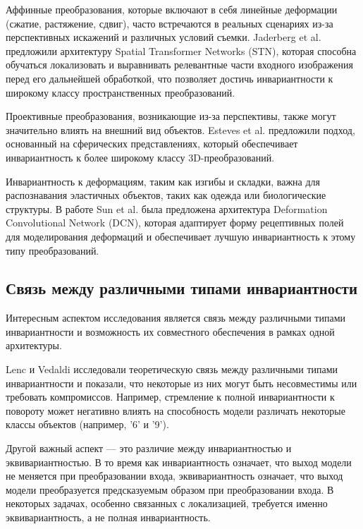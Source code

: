 Аффинные преобразования, которые включают в себя линейные деформации (сжатие, растяжение, сдвиг), часто встречаются в реальных сценариях из-за перспективных искажений и различных условий съемки. Jaderberg et al. \cite{Jaderberg2015} предложили архитектуру Spatial Transformer Networks (STN), которая способна обучаться локализовать и выравнивать релевантные части входного изображения перед его дальнейшей обработкой, что позволяет достичь инвариантности к широкому классу пространственных преобразований.

Проективные преобразования, возникающие из-за перспективы, также могут значительно влиять на внешний вид объектов. Esteves et al. \cite{Esteves2018} предложили подход, основанный на сферических представлениях, который обеспечивает инвариантность к более широкому классу 3D-преобразований.

Инвариантность к деформациям, таким как изгибы и складки, важна для распознавания эластичных объектов, таких как одежда или биологические структуры. В работе Sun et al. \cite{Sun2016} была предложена архитектура Deformation Convolutional Network (DCN), которая адаптирует форму рецептивных полей для моделирования деформаций и обеспечивает лучшую инвариантность к этому типу преобразований.

\subsection{Связь между различными типами инвариантности}
\label{review:other_invariance:connection}

Интересным аспектом исследования является связь между различными типами инвариантности и возможность их совместного обеспечения в рамках одной архитектуры.

Lenc и Vedaldi \cite{Lenc2019} исследовали теоретическую связь между различными типами инвариантности и показали, что некоторые из них могут быть несовместимы или требовать компромиссов. Например, стремление к полной инвариантности к повороту может негативно влиять на способность модели различать некоторые классы объектов (например, '6' и '9').

Другой важный аспект — это различие между инвариантностью и эквивариантностью. В то время как инвариантность означает, что выход модели не меняется при преобразовании входа, эквивариантность означает, что выход модели преобразуется предсказуемым образом при преобразовании входа. В некоторых задачах, особенно связанных с локализацией, требуется именно эквивариантность, а не полная инвариантность.

